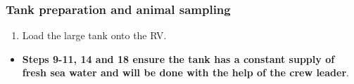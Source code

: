 \documentclass[
  letterpaper,
  DIV=11,
  numbers=noendperiod]{scrreprt}
\providecommand{\tightlist}{%
  \setlength{\itemsep}{0pt}\setlength{\parskip}{0pt}}\usepackage{longtable,booktabs,array}
\begin{document}
\hypertarget{tank-preparation-and-animal-sampling}{%
\subsubsection{Tank preparation and animal
sampling}\label{tank-preparation-and-animal-sampling}}

\begin{enumerate}
\def\labelenumi{\arabic{enumi}.}
\setcounter{enumi}{7}
\tightlist
\item
  Load the large tank onto the RV.
\end{enumerate}

\begin{itemize}
\tightlist
\item
  \textbf{Steps 9-11, 14 and 18 ensure the tank has a constant supply of
  fresh sea water and will be done with the help of the crew leader}.
\end{itemize}
\end{document}
